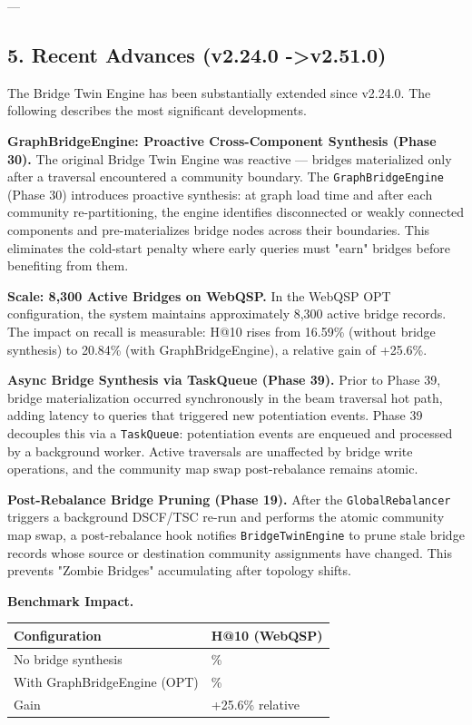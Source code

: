 ---

\subsection{5. Recent Advances (v2.24.0 -\textgreater  v2.51.0)}

The Bridge Twin Engine has been subst\-antially extended since v2.24.0. The following describes the most significant devel\-opments.

\textbf{GraphBridgeEngine: Proactive Cross-Component Synthesis (Phase 30).} The original Bridge Twin Engine was reactive — bridges mater\-ialized only after a traversal encountered a community boundary. The \texttt{GraphBridgeEngine} (Phase 30) introduces proactive synthesis: at graph load time and after each community re-parti\-tioning, the engine identifies disco\-nnected or weakly connected components and pre-mater\-ializes bridge nodes across their boundaries. This eliminates the cold-start penalty where early queries must "earn" bridges before benefiting from them.

\textbf{Scale: 8,300 Active Bridges on WebQSP.} In the WebQSP OPT confi\-guration, the system maintains appro\-ximately 8,300 active bridge records. The impact on recall is measurable: H@10 rises from 16.59\% (without bridge synthesis) to 20.84\% (with GraphBridgeEngine), a relative gain of +25.6\%.

\textbf{Async Bridge Synthesis via TaskQueue (Phase 39).} Prior to Phase 39, bridge mater\-ialization occurred synch\-ronously in the beam traversal hot path, adding latency to queries that triggered new poten\-tiation events. Phase 39 decouples this via a \texttt{TaskQueue}: poten\-tiation events are enqueued and processed by a background worker. Active traversals are unaffected by bridge write operations, and the community map swap post-rebalance remains atomic.

\textbf{Post-Rebalance Bridge Pruning (Phase 19).} After the \texttt{GlobalRebalancer} triggers a background DSCF/TSC re-run and performs the atomic community map swap, a post-rebalance hook notifies \texttt{BridgeTwinEngine} to prune stale bridge records whose source or destination community assignments have changed. This prevents "Zombie Bridges" accum\-ulating after topology shifts.

\textbf{Benchmark Impact.}

\begin{center}
\begin{tabularx}{\columnwidth}{|>{\raggedright\arraybackslash}X|>{\raggedright\arraybackslash}X|}
\hline
Config\-uration & H@10 (WebQSP) \\ \hline
No bridge synthesis & 16.59\% \\ \hline
With GraphBridgeEngine (OPT) & 20.84\% \\ \hline
Gain & +25.6\% relative \\ \hline
\end{tabularx}
\end{center}

